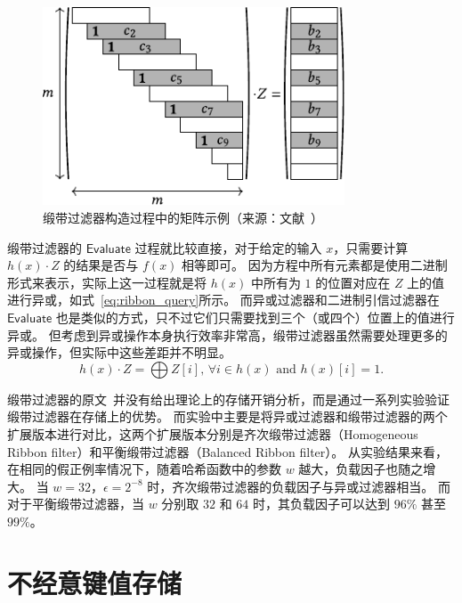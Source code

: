 \begin{figure}[ht]
  \centering
  \includegraphics[width=0.8\textwidth]{figures/ribbon_filter_construction.pdf}
  \caption{缎带过滤器构造过程中的矩阵示例（来源：文献~\cite{dillinger2021ribbon}）}
  \label{fig:ribbon_construc}
\end{figure}

缎带过滤器的 $\mathsf{Evaluate}$ 过程就比较直接，对于给定的输入 $x$，只需要计算 $h(x)\cdot Z$ 的结果是否与 $f(x)$ 相等即可。
因为方程中所有元素都是使用二进制形式来表示，实际上这一过程就是将 $h(x)$ 中所有为 $1$ 的位置对应在 $Z$ 上的值进行异或，如式~\ref{eq:ribbon_query}所示。
而异或过滤器和二进制引信过滤器在 $\mathsf{Evaluate}$ 也是类似的方式，只不过它们只需要找到三个（或四个）位置上的值进行异或。
但考虑到异或操作本身执行效率非常高，缎带过滤器虽然需要处理更多的异或操作，但实际中这些差距并不明显。
\begin{equation}
  h(x) \cdot Z = \bigoplus Z[i] \mbox{, } \forall i \in h(x) \mbox{ and } h(x)[i] = 1.
  \label{eq:ribbon_query}
\end{equation}

缎带过滤器的原文~\cite{dillinger2021ribbon}并没有给出理论上的存储开销分析，而是通过一系列实验验证缎带过滤器在存储上的优势。
而实验中主要是将异或过滤器和缎带过滤器的两个扩展版本进行对比，这两个扩展版本分别是齐次缎带过滤器（Homogeneous Ribbon filter）和平衡缎带过滤器（Balanced Ribbon filter）。
从实验结果来看，在相同的假正例率情况下，随着哈希函数中的参数 $w$ 越大，负载因子也随之增大。
当 $w=32$，$\epsilon=2^{-8}$ 时，齐次缎带过滤器的负载因子与异或过滤器相当。
而对于平衡缎带过滤器，当 $w$ 分别取 $32$ 和 $64$ 时，其负载因子可以达到 $96\%$ 甚至 $99\%$。

\section{不经意键值存储}

